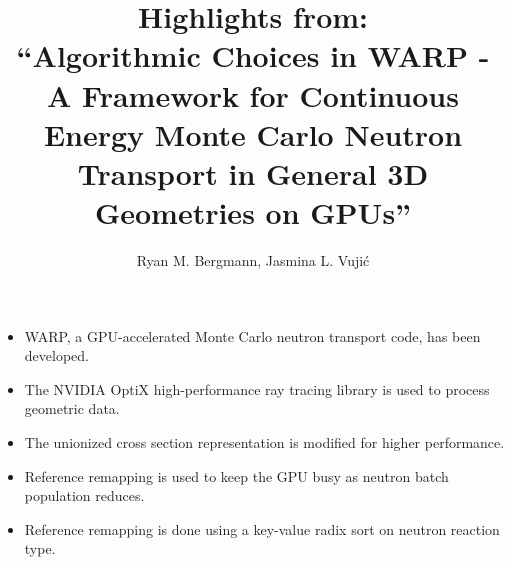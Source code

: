 \documentclass{article}
\begin{document}

\title{Highlights from:\\ ``Algorithmic Choices in WARP - A Framework for Continuous Energy Monte Carlo Neutron Transport in General 3D Geometries on GPUs''}
\author{Ryan M. Bergmann, Jasmina L. Vuji\'c}
\maketitle

\begin{itemize}
\item WARP, a GPU-accelerated Monte Carlo neutron transport code, has been developed.
\item The NVIDIA OptiX high-performance ray tracing library is used to process geometric data.
\item The unionized cross section representation is modified for higher performance.
\item Reference remapping is used to keep the GPU busy as neutron batch population reduces.
\item Reference remapping is done using a key-value radix sort on neutron reaction type.
\end{itemize}
\end{document}
